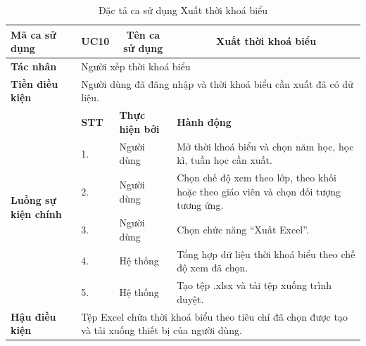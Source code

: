 \documentclass[../DoAn.tex]{subfiles}
\begin{document}
\begin{longtable}{|p{2.8cm}|p{1cm}|p{2.8cm}|p{6.3cm}|}
\caption{Đặc tả ca sử dụng Xuất thời khoá biểu}
\label{tab:app_uc_xuat_tkb} \\
\hline
\multicolumn{1}{|l|}{\textbf{Mã ca sử dụng}} & \multicolumn{1}{c|}{UC10} &
\multicolumn{1}{c|}{\textbf{Tên ca sử dụng}} & \multicolumn{1}{c|}{Xuất thời khoá biểu} \\
\hline
\multicolumn{1}{|l|}{\textbf{Tác nhân}} & \multicolumn{3}{l|}{Người xếp thời khoá biểu} \\
\hline
\multicolumn{1}{|l|}{\textbf{Tiền điều kiện}} & \multicolumn{3}{p{10.5cm}|}{Người dùng đã đăng nhập và thời khoá biểu cần xuất đã có dữ liệu.} \\
\hline
\multirow{6}{2.8cm}{\textbf{Luồng sự kiện chính}} & \textbf{STT} & \textbf{Thực hiện bởi} & \textbf{Hành động} \\
\cline{2-4}
& 1. & Người dùng & Mở thời khoá biểu và chọn năm học, học kì, tuần học cần xuất. \\
\cline{2-4}
& 2. & Người dùng & Chọn chế độ xem theo lớp, theo khối hoặc theo giáo viên và chọn đối tượng tương ứng. \\
\cline{2-4}
& 3. & Người dùng & Chọn chức năng ``Xuất Excel''. \\
\cline{2-4}
& 4. & Hệ thống & Tổng hợp dữ liệu thời khoá biểu theo chế độ xem đã chọn. \\
\cline{2-4}
& 5. & Hệ thống & Tạo tệp .xlsx và tải tệp xuống trình duyệt. \\
\hline
\multicolumn{1}{|l|}{\textbf{Hậu điều kiện}} & \multicolumn{3}{p{10.5cm}|}{Tệp Excel chứa thời khoá biểu theo tiêu chí đã chọn được tạo và tải xuống thiết bị của người dùng.} \\
\hline
\end{longtable}
\end{document}
